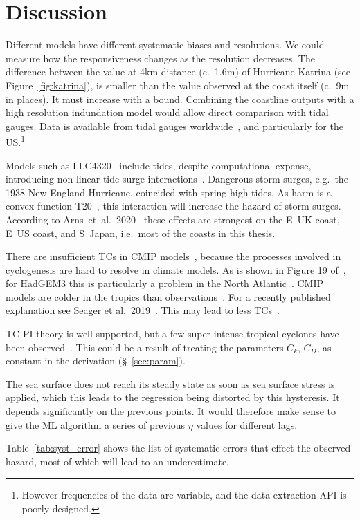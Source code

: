 \section{Discussion}
\label{sec:7_Discussion}

\label{sec:future}

Different models have different systematic biases
and resolutions. We could measure how
the responsiveness changes as the resolution decreases. The difference
between the value at 4km distance (c.~1.6m) of Hurricane Katrina (see Figure~\ref{fig:katrina}),
is smaller than the value observed at the coast itself (c.~9m in places).
It must increase with a bound.
Combining the coastline outputs with a high resolution indundation model
would allow direct comparison with tidal gauges.
Data is available from tidal gauges worldwide~\cite{tadesse2020data, arns2020non},
and particularly for the US.\footnote{
However frequencies of the data are variable,
and the data extraction API is poorly designed.}

Models such as LLC4320~\cite{Abernathey2017}  include tides,
 despite computational expense,
introducing non-linear tide-surge interactions~\cite{
feng2019characteristics, arns2020non}.
Dangerous storm surges, e.g.~the 1938 New England
Hurricane, coincided with spring high tides.
As harm is a convex function T20~\cite{taleb2019statistical, Taleb2012AntifragileH},
this interaction will increase the hazard of storm surges.
According to Arns~et~al.~2020~\cite{arns2020non}
these effects are strongest on the E~UK coast,
E~US coast, and S~Japan, i.e.~most of the coasts in
this thesis.

There are insufficient TCs in CMIP models~\cite{camargo2013global},
because the processes involved
in cyclogenesis are hard to resolve in climate models.
As is shown in Figure 19 of~\cite{williams2018met},
 for HadGEM3 this is particularly a problem in the North Atlantic~\cite{tomassini2017interaction}. %
CMIP models are colder in the tropics than observations~\cite{camargo2013global}.
For a recently published explanation see Seager et al.~2019~\cite{seager2019strengthening}.
This may lead to less TCs~\cite{tomassini2017interaction}.

TC PI theory is well supported,
but a few super-intense tropical cyclones have been observed~\cite{camargo2019tropical}.
This could be a result of treating the parameters $C_k$, $C_D$, as constant in the derivation (§~\ref{sec:param}).

The sea surface does not reach its steady state as soon as sea surface
stress is applied, which this leads
to the regression being distorted by this hysteresis.
It depends significantly on the previous points.
It would therefore make sense to give the ML algorithm
a series of previous $\eta$ values for different lags.


\label{sec:sys-errors}
Table~\ref{tab:syst_error} shows the list of systematic errors that effect the
observed hazard, most of which will lead to an underestimate.


